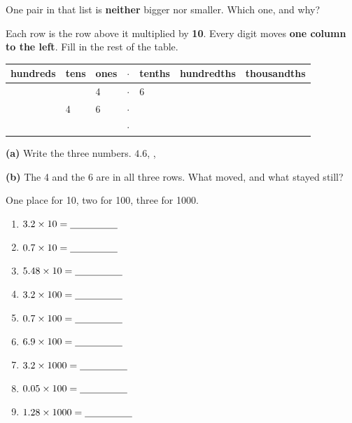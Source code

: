 \documentclass[12pt,a4paper]{article}
\newcommand{\ansline}[1][4.4cm]{\par\vspace{2pt}\hspace*{\fill}\blank[#1]\par}
\newcommand{\pvhead}{%
  \textbf{hundreds} & \textbf{tens} & \textbf{ones} & \textbf{$\cdot$} &
  \textbf{tenths} & \textbf{hundredths} & \textbf{thousandths}}
\newenvironment{pvtable}{%
  \renewcommand{\arraystretch}{1.7}%
  \small
  \noindent
  \begin{tabular}{|C{1.9cm}|C{1.9cm}|C{1.9cm}|C{0.5cm}|C{1.9cm}|C{2.3cm}|C{2.5cm}|}
  \hline}
  {\end{tabular}\renewcommand{\arraystretch}{1.45}}
\begin{document}
\vspace{2pt}
\noindent One pair in that list is \textbf{neither} bigger nor smaller. Which one, and
why?
\ansline[8.0cm]



\noindent Each row is the row above it multiplied by \textbf{10}. Every digit moves
\textbf{one column to the left}. Fill in the rest of the table.

\vspace{6pt}
\begin{center}
\begin{pvtable}
  \pvhead \\ \hline
  \rule{0pt}{1.6em} & & 4 & $\cdot$ & 6 & & \\ \hline
  \rule{0pt}{1.6em} & 4 & 6 & $\cdot$ & & & \\ \hline
  \rule{0pt}{1.6em} & & & $\cdot$ & & & \\ \hline
\end{pvtable}
\end{center}

\vspace{6pt}
\noindent \textbf{(a)} Write the three numbers. \; $4.6$, \blank[2.4cm],
\blank[2.4cm]

\vspace{7pt}
\noindent \textbf{(b)} The 4 and the 6 are in all three rows. What moved, and what
stayed still?
\ansline[8.0cm]


\noindent One place for 10, two for 100, three for 1000.

\vspace{4pt}
\begin{multicols}{3}
\begin{enumerate}[label=(\alph*), itemsep=11pt]
  \item $3.2 \times 10 = \blank[1.7cm]$
  \item $0.7 \times 10 = \blank[1.7cm]$
  \item $5.48 \times 10 = \blank[1.7cm]$
  \item $3.2 \times 100 = \blank[1.7cm]$
  \item $0.7 \times 100 = \blank[1.7cm]$
  \item $6.9 \times 100 = \blank[1.7cm]$
  \item $3.2 \times 1000 = \blank[1.7cm]$
  \item $0.05 \times 100 = \blank[1.7cm]$
  \item $1.28 \times 1000 = \blank[1.7cm]$
\end{enumerate}
\end{multicols}
\end{document}
